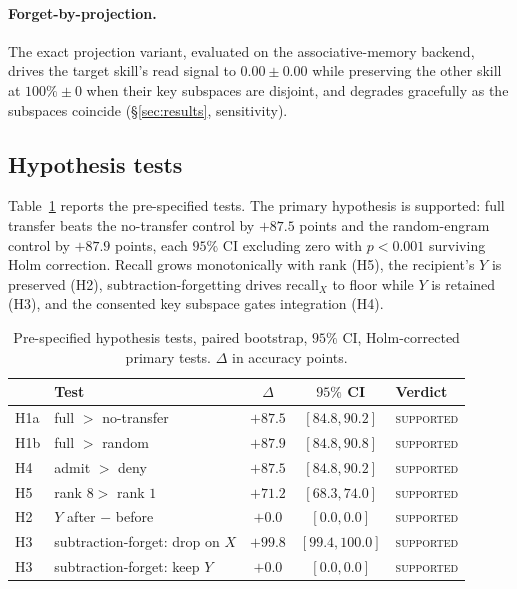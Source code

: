 \documentclass[11pt]{article}
\theoremstyle{definition}
\begin{document}
\paragraph{Forget-by-projection.}
The exact projection variant, evaluated on the associative-memory backend, drives the target skill's read signal to $0.00\pm0.00$ while preserving the other skill at $100\%\pm0$ when their key subspaces are disjoint, and degrades gracefully as the subspaces coincide (\S\ref{sec:results}, sensitivity).

\subsection{Hypothesis tests}

Table~\ref{tab:tests} reports the pre-specified tests. The primary hypothesis is supported: full transfer beats the no-transfer control by $+87.5$ points and the random-engram control by $+87.9$ points, each $95\%$ CI excluding zero with $p<0.001$ surviving Holm correction. Recall grows monotonically with rank (H5), the recipient's $Y$ is preserved (H2), subtraction-forgetting drives recall$_X$ to floor while $Y$ is retained (H3), and the consented key subspace gates integration (H4).

\begin{table}[h]
\centering
\caption{Pre-specified hypothesis tests, paired bootstrap, $95\%$ CI, Holm-corrected primary tests. $\Delta$ in accuracy points.}
\label{tab:tests}
\begin{tabular}{llccl}
\toprule
 & Test & $\Delta$ & $95\%$ CI & Verdict \\
\midrule
H1a & full $>$ no-transfer & $+87.5$ & $[84.8,90.2]$ & \textsc{supported} \\
H1b & full $>$ random & $+87.9$ & $[84.8,90.8]$ & \textsc{supported} \\
H4 & admit $>$ deny & $+87.5$ & $[84.8,90.2]$ & \textsc{supported} \\
H5 & rank $8 >$ rank $1$ & $+71.2$ & $[68.3,74.0]$ & \textsc{supported} \\
H2 & $Y$ after $-$ before & $+0.0$ & $[0.0,0.0]$ & \textsc{supported} \\
H3 & subtraction-forget: drop on $X$ & $+99.8$ & $[99.4,100.0]$ & \textsc{supported} \\
H3 & subtraction-forget: keep $Y$ & $+0.0$ & $[0.0,0.0]$ & \textsc{supported} \\
\bottomrule
\end{tabular}
\end{table}
\end{document}
